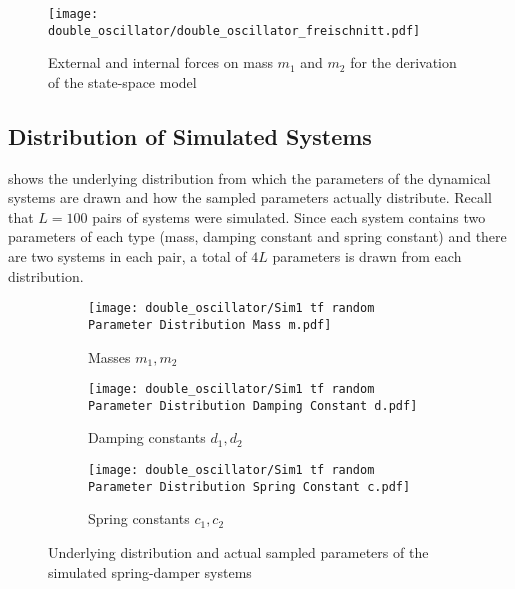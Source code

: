 \begin{figure}
        \centering
        \texttt{[image: double\_oscillator/double\_oscillator\_freischnitt.pdf]}
        \caption[Double Oscillator -- External and Internal Forces]{External and internal forces on mass $m_1$ and $m_2$ for the derivation of the state-space model}
        \label{fig:app_sim1_forces}
\end{figure}
	
\subsection{Distribution of Simulated Systems}
 shows the underlying distribution from which the parameters of the dynamical systems are drawn and how the sampled parameters actually distribute. Recall that $L=100$ pairs of systems were simulated. Since each system contains two parameters of each type (mass, damping constant and spring constant) and there are two systems in each pair, a total of $4L$ parameters is drawn from each distribution.\\
	
\begin{figure}
    \centering
    \begin{subfigure}[t]{0.495\textwidth}
        \centering
        \texttt{[image: double\_oscillator/Sim1 tf random Parameter Distribution Mass m.pdf]}
        \caption{Masses $m_1, m_2$}
    \end{subfigure}
    \hfill
    \begin{subfigure}[t]{0.495\textwidth}
        \centering
        \texttt{[image: double\_oscillator/Sim1 tf random Parameter Distribution Damping Constant d.pdf]}
        \caption{Damping constants $d_1, d_2$}
    \end{subfigure}
    \hfill
    \begin{subfigure}[t]{0.495\textwidth}
        \centering
        \texttt{[image: double\_oscillator/Sim1 tf random Parameter Distribution Spring Constant c.pdf]}
        \caption{Spring constants $c_1, c_2$}
    \end{subfigure}
    \caption[Double Oscillator -- Parameter Distributions]{Underlying distribution and actual sampled parameters of the simulated spring-damper systems}
    \label{fig:sim1_app_param_dist}
\end{figure}	
	
